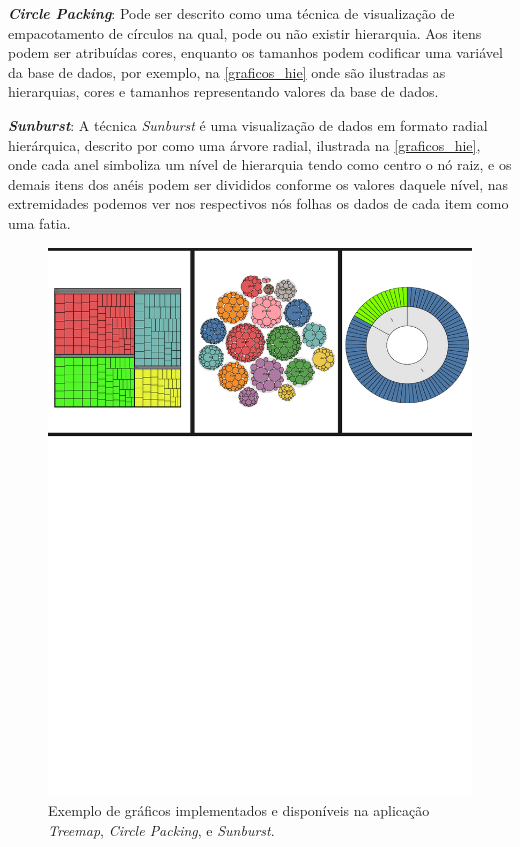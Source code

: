 \documentclass[
	12pt,				%
	openright,			%
	oneside,			%
	a4paper,			%
	english,			%
	brazil				%
	]{abntex2}
\begin{document}
\textbf{\textit{Circle Packing}}:
    Pode ser descrito como uma técnica de visualização de empacotamento de círculos na qual, pode ou não existir hierarquia. Aos itens podem ser atribuídas cores, enquanto os tamanhos podem codificar uma variável da base de dados, por exemplo, na \autoref{graficos_hie} onde são ilustradas as hierarquias, cores e tamanhos representando valores da base de dados.
    
\textbf{\textit{Sunburst}}:
    A técnica \textit{Sunburst} é uma visualização de dados em formato radial hierárquica, descrito por \cite{Stasko}  como uma árvore radial, ilustrada na \autoref{graficos_hie}, onde cada anel simboliza um nível de hierarquia tendo como centro o nó raiz, e os demais itens dos anéis podem ser divididos conforme os valores daquele nível, nas extremidades podemos ver nos respectivos nós folhas os dados de cada item como uma fatia.
    
    
\begin{figure}[h]
	\caption{\label{graficos_hie} Exemplo de gráficos implementados e disponíveis na aplicação \textit{Treemap},  \textit{Circle Packing}, e  \textit{Sunburst}. }
	\begin{center}
	    \includegraphics[width=\textwidth,size=1, trim={0mm 180mm, 0mm 0mm},clip]{figures/garficos_1.pdf}
	\end{center}
\end{figure}
\end{document}
